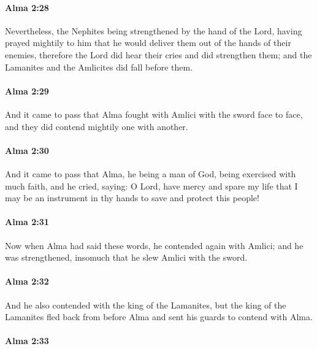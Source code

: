 		\paragraph{Alma 2:28} %
			\label{ALMA-2-28}

			Nevertheless, the Nephites being strengthened by the hand of the Lord,
			having prayed mightily to him
			that he would deliver them out of the hands of their enemies,
			therefore the Lord did hear their cries and did strengthen them;
			and the Lamanites and the Amlicites did fall before them.

		\paragraph{Alma 2:29} %
			\label{ALMA-2-29}

			And it came to pass that Alma fought with Amlici with the sword face to face,
			and they did contend mightily one with another.

		\paragraph{Alma 2:30} %
			\label{ALMA-2-30}

			And it came to pass that Alma, he being a man of God,
			being exercised with much faith,
			and he cried, saying:
			O Lord, have mercy and spare my life
			that I may be an instrument in thy hands to save and protect this people!

		\paragraph{Alma 2:31} %
			\label{ALMA-2-31}

			Now when Alma had said these words,
			he contended again with Amlici;
			and he was strengthened,
			insomuch that he slew Amlici with the sword.

		\paragraph{Alma 2:32} %
			\label{ALMA-2-32}

			And he also contended with the king of the Lamanites,
			but the king of the Lamanites fled back from before Alma
			and sent his guards to contend with Alma.

		\paragraph{Alma 2:33} %
			\label{ALMA-2-33}

